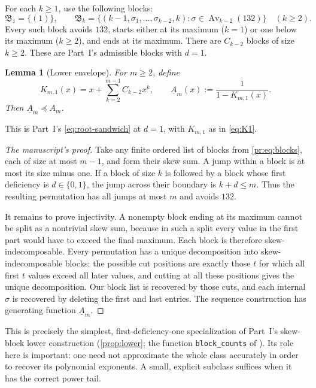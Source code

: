 \documentclass[11pt,a4paper]{article}
\newtheorem{lemma}[lemma]{Lemma}
\theoremstyle{definition}\newaliascnt{definition}{theorem}
\theoremstyle{remark}\newaliascnt{remark}{theorem}
\newcommand{\Av}{\operatorname{Av}}
\newcommand{\preceqc}{\preceq}
\begin{document}
For each $k\ge1$, use the following blocks:
\begin{equation}
 \mathfrak B_1=\{(1)\},\qquad
 \mathfrak B_k=\{(k-1,\sigma_1,\ldots,\sigma_{k-2},k):
               \sigma\in\Av_{k-2}(132)\}\quad(k\ge2).
 \label{pr:eq:blocks}
\end{equation}
Every such block avoids $132$, starts either at its maximum ($k=1$) or one
below its maximum ($k\ge2$), and ends at its maximum. There are $C_{k-2}$
blocks of size $k\ge2$. These are Part~I's admissible blocks with $d=1$.

\begin{lemma}[Lower envelope]\label{pr:lem:lower}
For $m\ge2$, define
\begin{equation}
 K_{m,1}(x)=x+\sum_{k=2}^{m-1}C_{k-2}x^k,
 \qquad
 \underline A_m(x):=\frac1{1-K_{m,1}(x)}.
 \label{pr:eq:lowergf}
\end{equation}
Then $\underline A_m\preceqc A_m$.
\end{lemma}
This is Part~I's \eqref{eq:root-sandwich} at $d=1$, with $K_{m,1}$ as in
\eqref{eq:K1}.
\begin{proof}[The manuscript's proof]
Take any finite ordered list of blocks from \eqref{pr:eq:blocks}, each of
size at most $m-1$, and form their skew sum. A jump within a block is at
most its size minus one. If a block of size $k$ is followed by a block whose
first deficiency is $d\in\{0,1\}$, the jump across their boundary is
$k+d\le m$. Thus the resulting permutation has all jumps at most $m$ and
avoids $132$.

It remains to prove injectivity. A nonempty block ending at its maximum
cannot be split as a nontrivial skew sum, because in such a split every value
in the first part would have to exceed the final maximum. Each block is
therefore skew-indecomposable. Every permutation has a unique decomposition
into skew-indecomposable blocks: the possible cut positions are exactly those
$t$ for which all first $t$ values exceed all later values, and cutting at
all these positions gives the unique decomposition. Our block list is
recovered by those cuts, and each internal $\sigma$ is recovered by deleting
the first and last entries. The sequence construction has generating
function $\underline A_m$.
\end{proof}

This is precisely the simplest, first-deficiency-one specialization of
Part~I's skew-block lower construction (\cref{prop:lower}; the function
\texttt{block\_counts} of ). Its role here is important:
one need not approximate the whole class accurately in order to recover its
polynomial exponents. A small, explicit subclass suffices when it has the
correct power tail.
\end{document}
